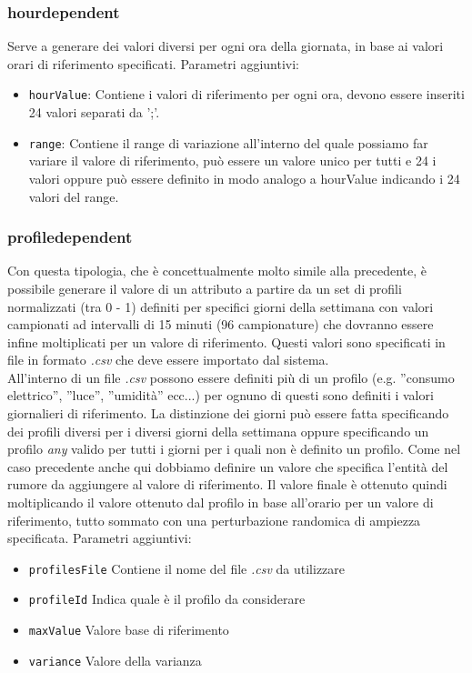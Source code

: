 \documentclass[12pt,a4paper,italian]{article}
\begin{document}
\subsubsection{\large{hourdependent}} Serve a generare dei valori diversi per ogni ora della giornata, in base ai valori orari di riferimento specificati.
Parametri aggiuntivi:
\begin{itemize}
	\item \texttt{hourValue}: Contiene i valori di riferimento per ogni ora, devono essere inseriti 24 valori separati da ';'. 
	\item \texttt{range}: Contiene il range di variazione all'interno del quale possiamo far variare il valore di riferimento, può essere un
	valore unico per tutti e 24 i valori oppure può essere definito in modo analogo a hourValue indicando i 24 valori del range.
\end{itemize}
\subsubsection{\large{profiledependent}} Con questa tipologia, che è concettualmente molto simile alla precedente, è possibile generare il valore di un attributo a partire da un set di profili normalizzati (tra 0 - 1) definiti per specifici giorni della settimana con
valori campionati ad intervalli di 15 minuti (96 campionature) che dovranno essere infine moltiplicati per un valore di riferimento. Questi valori sono specificati in file in formato \emph{.csv} che deve essere importato dal sistema.\\
All'interno di un file \emph{.csv} possono essere definiti più di un profilo (e.g. ''consumo elettrico'', ''luce'', ''umidità''  ecc...) per ognuno di questi sono definiti i valori giornalieri di riferimento. La distinzione dei giorni può essere fatta specificando dei profili diversi per i diversi giorni della settimana oppure specificando un profilo \emph{any} valido per tutti i giorni per i quali non è definito un profilo. Come nel caso precedente anche qui dobbiamo definire un valore che specifica l'entità del rumore da aggiungere al valore di riferimento. Il valore finale è ottenuto quindi moltiplicando il valore ottenuto dal profilo in base all'orario per un valore di riferimento, tutto sommato con una perturbazione randomica di ampiezza specificata.
Parametri aggiuntivi:
\begin{itemize}
	\item \texttt{profilesFile} Contiene il nome del file \emph{.csv} da utilizzare
	\item \texttt{profileId} Indica quale è il profilo da considerare
	\item \texttt{maxValue} Valore base di riferimento 
	\item \texttt{variance} Valore della varianza 
\end{itemize}  
\end{document}
